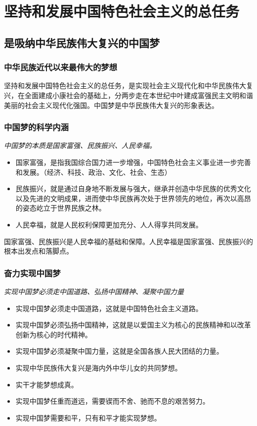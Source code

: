 \chapter{坚持和发展中国特色社会主义的总任务}

\section{是吸纳中华民族伟大复兴的中国梦}
    \subsection{中华民族近代以来最伟大的梦想}
        坚持和发展中国特色社会主义的总任务，是实现社会主义现代化和中华民族伟大复兴，在全面建成小康社会的基础上，分两步走在本世纪中叶建成富强民主文明和谐美丽的社会主义现代化强国。中国梦是中华民族伟大复兴的形象表达。

    \subsection{中国梦的科学内涵}
        \emph{中国梦的本质是国家富强、民族振兴、人民幸福。}
        \begin{itemize}
            \item 国家富强，是指我国综合国力进一步增强，中国特色社会主义事业进一步完善和发展。（经济、科技、政治、文化、社会、生态）
            \item 民族振兴，就是通过自身地不断发展与强大，继承并创造中华民族的优秀文化以及先进的文明成果，进而使中华民族再次处于世界领先的地位，再次以高昂的姿态屹立于世界民族之林。
            \item 人民幸福，就是人民权利保障更加充分、人人得享共同发展。
        \end{itemize}

        国家富强、民族振兴是人民幸福的基础和保障。人民幸福是国家富强、民族振兴的根本出发点和落脚点。

    \subsection{奋力实现中国梦}
        \emph{实现中国梦必须走中国道路、弘扬中国精神、凝聚中国力量}
        \begin{itemize}
            \item 实现中国梦必须走中国道路，这就是中国特色社会主义道路。
            \item 实现中国梦必须弘扬中国精神，这就是以爱国主义为核心的民族精神和以改革创新为核心的时代精神。
            \item 实现中国梦必须凝聚中国力量，这就是全国各族人民大团结的力量。
            \item 实现中华民族伟大复兴是海内外中华儿女的共同梦想。
            \item 实干才能梦想成真。
            \item 实现中国梦任重而道远，需要锲而不舍、驰而不息的艰苦努力。
            \item 实现中国梦需要和平，只有和平才能实现梦想。
        \end{itemize}


